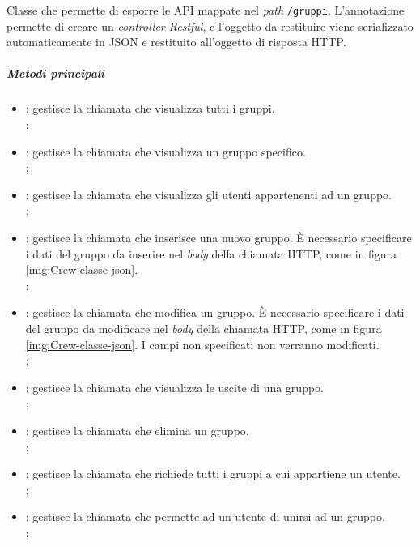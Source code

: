 \label{par:GruppiController}
Classe che permette di esporre le \gls{API} mappate nel \textit{path} \texttt{/gruppi}. 
L'annotazione  permette di creare un \textit{controller Restful}, e l'oggetto da restituire viene serializzato automaticamente in JSON e restituito all'oggetto di risposta HTTP.
\subparagraph*{Metodi principali}
\begin{itemize}
    \item {}: gestisce la chiamata che visualizza tutti i gruppi.\\ ;
    \item {}:  gestisce la chiamata che visualizza un gruppo specifico. \\ ;
    \item {}: gestisce la chiamata che visualizza gli utenti appartenenti ad un gruppo. \\ ;
    \item {}: gestisce la chiamata che inserisce una nuovo gruppo. È necessario specificare i dati del gruppo da inserire nel \textit{body} della chiamata HTTP, come in figura \ref{img:Crew-classe-json}.   \\ ;
    \item {}: gestisce la chiamata che modifica un gruppo. È necessario specificare i dati del gruppo da modificare nel \textit{body} della chiamata HTTP, come in figura \ref{img:Crew-classe-json}. I campi non specificati non verranno modificati. \\ ;
    \item {}: gestisce la chiamata che visualizza le uscite di una gruppo.\\ ;
    \item {}: gestisce la chiamata che elimina un gruppo. \\ ;
    \item {}: gestisce la chiamata che richiede tutti i gruppi a cui appartiene un utente. \\ ;
    \item {}: gestisce la chiamata che permette ad un utente di unirsi ad un gruppo. \\ ;

\end{itemize}
